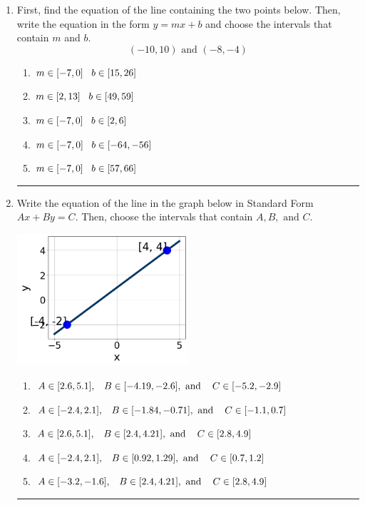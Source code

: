 \documentclass[14pt]{extbook}
\newcommand{\litem}[1]{\item#1\hspace*{-1cm}\rule{\textwidth}{0.4pt}}
\begin{document}
\begin{enumerate}
{\begin{enumerate}[label=\Alph*.]
\end{enumerate} }
\litem{
First, find the equation of the line containing the two points below. Then, write the equation in the form $ y=mx+b $ and choose the intervals that contain $m$ and $b$.\[ (-10, 10) \text{ and } (-8, -4) \]\begin{enumerate}[label=\Alph*.]
\item \( m \in [-7, 0] \hspace*{3mm} b \in [15, 26] \)
\item \( m \in [2, 13] \hspace*{3mm} b \in [49, 59] \)
\item \( m \in [-7, 0] \hspace*{3mm} b \in [2, 6] \)
\item \( m \in [-7, 0] \hspace*{3mm} b \in [-64, -56] \)
\item \( m \in [-7, 0] \hspace*{3mm} b \in [57, 66] \)

\end{enumerate} }
\litem{
Write the equation of the line in the graph below in Standard Form $Ax+By=C$. Then, choose the intervals that contain $A, B, \text{ and } C$.
\begin{center}
    \includegraphics[width=0.5\textwidth]{../Figures/linearGraphToStandardC.png}
\end{center}
\begin{enumerate}[label=\Alph*.]
\item \( A \in [2.6, 5.1], \hspace{3mm} B \in [-4.19, -2.6], \text{ and } \hspace{3mm} C \in [-5.2, -2.9] \)
\item \( A \in [-2.4, 2.1], \hspace{3mm} B \in [-1.84, -0.71], \text{ and } \hspace{3mm} C \in [-1.1, 0.7] \)
\item \( A \in [2.6, 5.1], \hspace{3mm} B \in [2.4, 4.21], \text{ and } \hspace{3mm} C \in [2.8, 4.9] \)
\item \( A \in [-2.4, 2.1], \hspace{3mm} B \in [0.92, 1.29], \text{ and } \hspace{3mm} C \in [0.7, 1.2] \)
\item \( A \in [-3.2, -1.6], \hspace{3mm} B \in [2.4, 4.21], \text{ and } \hspace{3mm} C \in [2.8, 4.9] \)


\end{enumerate}}
\end{enumerate}
\end{document}
